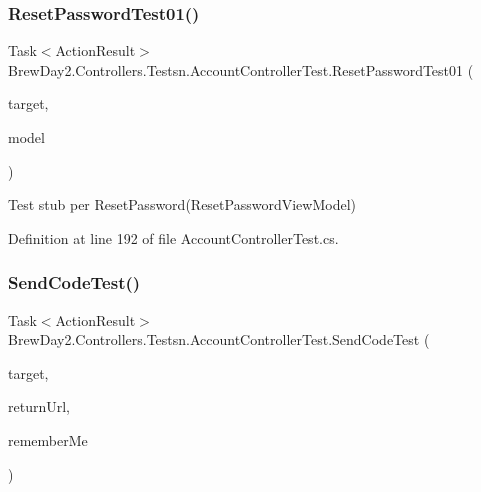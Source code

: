 \subsubsection{\texorpdfstring{Reset\+Password\+Test01()}{ResetPasswordTest01()}}
{\footnotesize\ttfamily Task$<$Action\+Result$>$ Brew\+Day2.\+Controllers.\+Testsn.\+Account\+Controller\+Test.\+Reset\+Password\+Test01 (\begin{DoxyParamCaption}\item[{\mbox{[}\+Pex\+Assume\+Under\+Test\mbox{]} \mbox{\hyperlink{class_brew_day2_1_1_controllers_1_1_account_controller}{Account\+Controller}}}]{target,  }\item[{\mbox{\hyperlink{class_brew_day2_1_1_models_1_1_reset_password_view_model}{Reset\+Password\+View\+Model}}}]{model }\end{DoxyParamCaption})}



Test stub per Reset\+Password(\+Reset\+Password\+View\+Model)



Definition at line 192 of file Account\+Controller\+Test.\+cs.

\mbox{\label{class_brew_day2_1_1_controllers_1_1_testsn_1_1_account_controller_test_ae9aee8bf96728cbea4ae856e3232d5a5}} 
\subsubsection{\texorpdfstring{Send\+Code\+Test()}{SendCodeTest()}}
{\footnotesize\ttfamily Task$<$Action\+Result$>$ Brew\+Day2.\+Controllers.\+Testsn.\+Account\+Controller\+Test.\+Send\+Code\+Test (\begin{DoxyParamCaption}\item[{\mbox{[}\+Pex\+Assume\+Under\+Test\mbox{]} \mbox{\hyperlink{class_brew_day2_1_1_controllers_1_1_account_controller}{Account\+Controller}}}]{target,  }\item[{string}]{return\+Url,  }\item[{bool}]{remember\+Me }\end{DoxyParamCaption})}



